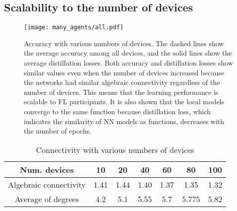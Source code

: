 \documentclass[journal]{IEEEtran}
\begin{document}
\subsection{Scalability to the number of devices}
\begin{figure}[!t]
\centering
\texttt{[image: many\_agents/all.pdf]}
\caption{Accuracy with various numbers of devices.
The dashed lines show the average accuracy among all devices, and the solid lines show the average distillation losses.
Both accuracy and distillation losses show similar values even when the number of devices increased
because the networks had similar algebraic connectivity regardless of the number of devices.
This means that the learning performance is scalable to \gls{FL} participants.
It is also shown that the local models converge to the same function
because distillation loss, which indicates the similarity of \gls{NN} models as functions, decreases with the number of epochs.
}
\label{fig:eval_num_devices}
\end{figure}
\begin{table}[!t]
\caption{Connectivity with various numbers of devices}
\label{tbl:connectivity_num}
\centering
\begin{tabular}{ccccccc}
\toprule
Num. devices & 10 & 20 & 40 & 60 & 80 & 100 \\
\midrule
Algebraic connectivity & 1.41 & 1.44 & 1.40 & 1.37 & 1.35 & 1.32 \\
Average of degrees & 4.2 & 5.1 & 5.55 & 5.7 & 5.775 & 5.82 \\
\bottomrule
\end{tabular}
\end{table}
\end{document}
